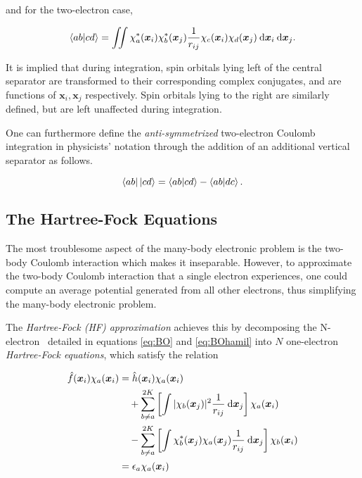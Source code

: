 \noindent and for the two-electron case,

\begin{equation}
	\braket{ab|cd} = \iint \chi_a^* (\bm x_i) \chi_b^*(\bm x_j)
	\frac{1}{r_{ij}}
	\chi_c (\bm x_i) \chi_d (\bm x_j) \:\mathrm{d} \bm x_i \:\mathrm{d} \bm x_j.
\end{equation}

It is implied that during integration, spin orbitals lying left of the central
separator are transformed to their corresponding complex conjugates, and are
functions of $\bm x_i, \bm x_j$ respectively. Spin orbitals lying to the right
are similarly defined, but are left unaffected during integration.

One can furthermore define the \emph{anti-symmetrized} two-electron Coulomb
integration in physicists' notation through the addition of an additional
vertical separator as follows.

\begin{equation}
	\bra{ab} \ket{cd} = \braket{ab|cd} - \braket{ab|dc}.
\end{equation}

\subsection{The Hartree-Fock Equations}

The most troublesome aspect of the many-body electronic problem is the two-body
Coulomb interaction which makes it inseparable. However, to approximate the
two-body Coulomb interaction that a single electron experiences, one could
compute an average potential generated from all other electrons, thus
simplifying the many-body electronic problem.

The \emph{Hartree-Fock (HF) approximation} achieves this by decomposing the
N-electron \SE\ detailed in equations \ref{eq:BO} and \ref{eq:BOhamil} into $N$
one-electron \emph{Hartree-Fock equations}, which satisfy the relation

\begin{equation}
\begin{split}
	\label{eq:fock}
	\hat f(\bm x_i) \chi_a (\bm x_i)
	&= \hat h(\bm x_i) \chi_a (\bm x_i) \\
	&\quad + \sum_{b \neq a}^{2K} \left[ \int |\chi_b(\bm x_j)|^2 \frac{1}{r_{ij}} \:\mathrm{d} \bm x_j \right] \chi_a (\bm x_i) \\
	&\quad - \sum_{b \neq a}^{2K} \left[ \int \chi_b^*(\bm x_j) \chi_a(\bm x_j) \frac{1}{r_{ij}} \:\mathrm{d} \bm x_j \right] \chi_b (\bm x_i) \\
	&= \epsilon_a \chi_a (\bm x_i)
\end{split}
\end{equation}

